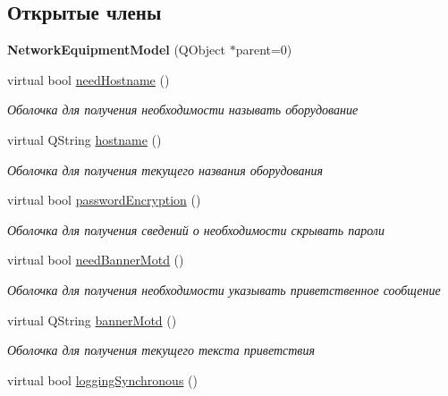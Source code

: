 \subsection*{Открытые члены}
\begin{DoxyCompactItemize}
\item 
{\bfseries Network\+Equipment\+Model} (Q\+Object $\ast$parent=0)\hypertarget{class_network_equipment_model_a757c88ce2d675d041d3539200f9f0a46}{}\label{class_network_equipment_model_a757c88ce2d675d041d3539200f9f0a46}

\item 
virtual bool \hyperlink{class_network_equipment_model_a67cb5cf3284a19a1a0d6a7b22fa2a91e}{need\+Hostname} ()
\begin{DoxyCompactList}\small\item\em Оболочка для получения необходимости называть оборудование \end{DoxyCompactList}\item 
virtual Q\+String \hyperlink{class_network_equipment_model_a59f5581ce5f16229235bc9ace24e11d6}{hostname} ()
\begin{DoxyCompactList}\small\item\em Оболочка для получения текущего названия оборудования \end{DoxyCompactList}\item 
virtual bool \hyperlink{class_network_equipment_model_a46900023e99e2791d5e0ff85204f25fb}{password\+Encryption} ()
\begin{DoxyCompactList}\small\item\em Оболочка для получения сведений о необходимости скрывать пароли \end{DoxyCompactList}\item 
virtual bool \hyperlink{class_network_equipment_model_ab20b1087ae50a8546bdabfa598e8c647}{need\+Banner\+Motd} ()
\begin{DoxyCompactList}\small\item\em Оболочка для получения необходимости указывать приветственное сообщение \end{DoxyCompactList}\item 
virtual Q\+String \hyperlink{class_network_equipment_model_a9256503fdb609788939777565574ae7c}{banner\+Motd} ()
\begin{DoxyCompactList}\small\item\em Оболочка для получения текущего текста приветствия \end{DoxyCompactList}\item 
virtual bool \hyperlink{class_network_equipment_model_a7321ba74141fd1bc694a6607363625ae}{logging\+Synchronous} ()

\end{DoxyCompactItemize}
